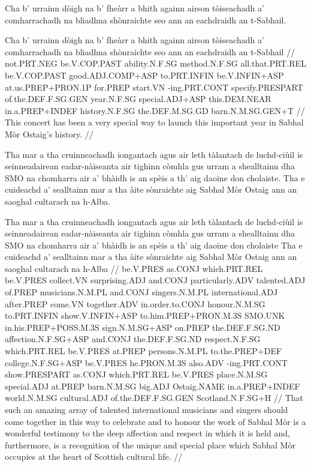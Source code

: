 \documentclass[a4paper,10pt]{article}
\begin{document}
\ex
\begingl
\glpre Cha b' urrainn dòigh na b' fheàrr a bhith againn airson tòiseachadh a' comharrachadh na bliadhna shònraichte seo ann an eachdraidh an t-Sabhail. 

\vspace{4mm}
\gla Cha b' urrainn dòigh na b' fheàrr a bhith againn airson tòiseachadh a' comharrachadh na bliadhna shònraichte seo {ann an} eachdraidh an t-Sabhail  //
\glb not.PRT.NEG be.V.COP.PAST ability.N.F.SG method.N.F.SG all.that.PRT.REL be.V.COP.PAST good.ADJ.COMP+ASP to.PRT.INFIN be.V.INFIN+ASP at.us.PREP+PRON.1P for.PREP start.VN -ing.PRT.CONT specify.PRESPART of.the.DEF.F.SG.GEN year.N.F.SG special.ADJ+ASP this.DEM.NEAR in.a.PREP+INDEF history.N.F.SG the.DEF.M.SG.GD barn.N.M.SG.GEN+T  //
\glft This concert has been a very special way to launch this important year in Sabhal Mòr Ostaig's history. //
\endgl
\xe

\ex
\begingl
\glpre Tha mar a tha cruinneachadh iongantach agus air leth tàlantach de luchd-ciùil is seinneadairean eadar-nàiseanta air tighinn còmhla gus urram a shealltainn dha SMO na chomharra air a' bhàidh is an spèis a th' aig daoine don cholaiste. Tha e cuideachd a' sealltainn mar a tha àite sònraichte aig Sabhal Mòr Ostaig ann an saoghal cultarach na h-Alba. 

\vspace{4mm}
\gla Tha mar a tha cruinneachadh iongantach agus {air leth} tàlantach de luchd-ciùil is seinneadairean eadar-nàiseanta air tighinn còmhla gus urram a shealltainn dha SMO na chomharra air a' bhàidh is an spèis a th' aig daoine don cholaiste Tha e cuideachd a' sealltainn mar a tha àite sònraichte aig Sabhal Mòr Ostaig {ann an} saoghal cultarach na h-Alba  //
\glb be.V.PRES as.CONJ which.PRT.REL be.V.PRES collect.VN surprising.ADJ and.CONJ particularly.ADV talented.ADJ of.PREP musicians.N.M.PL and.CONJ singers.N.M.PL international.ADJ after.PREP come.VN together.ADV in.order.to.CONJ honour.N.M.SG to.PRT.INFIN show.V.INFIN+ASP to.him.PREP+PRON.M.3S SMO.UNK in.his.PREP+POSS.M.3S sign.N.M.SG+ASP on.PREP the.DEF.F.SG.ND affection.N.F.SG+ASP and.CONJ the.DEF.F.SG.ND respect.N.F.SG which.PRT.REL be.V.PRES at.PREP persons.N.M.PL to.the.PREP+DEF college.N.F.SG+ASP be.V.PRES he.PRON.M.3S also.ADV -ing.PRT.CONT show.PRESPART as.CONJ which.PRT.REL be.V.PRES place.N.M.SG special.ADJ at.PREP barn.N.M.SG big.ADJ Ostaig.NAME in.a.PREP+INDEF world.N.M.SG cultural.ADJ of.the.DEF.F.SG.GEN Scotland.N.F.SG+H  //
\glft That such an amazing array of talented international musicians and singers should come together in this way to celebrate and to honour the work of Sabhal Mòr is a wonderful testimony to the deep affection and respect in which it is held and, furthermore, is a recognition of the unique and special place which Sabhal Mòr occupies at the heart of Scottish cultural life. //
\endgl
\xe
\end{document}
